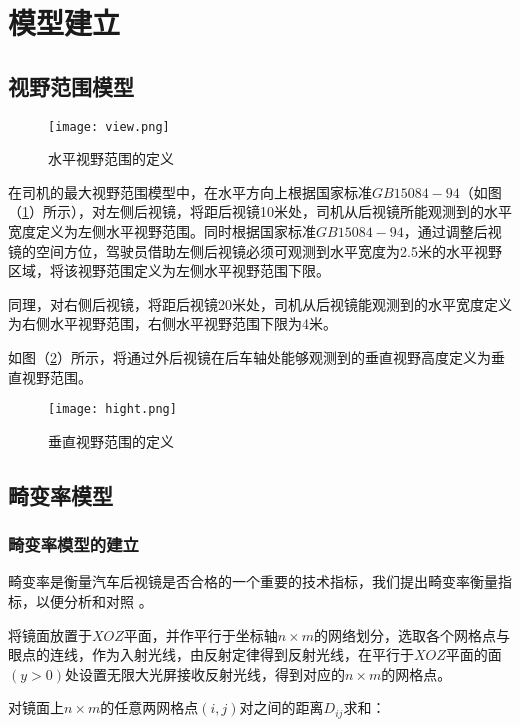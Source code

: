 \documentclass[withoutpreface,bwprint]{cumcmthesis} %
\begin{document}
\section{模型建立}
\subsection{视野范围模型}

\begin{figure}[!htb]
\centering
\texttt{[image: view.png]}
\caption{水平视野范围的定义}
\label{view}
\end{figure}

\par 在司机的最大视野范围模型中，在水平方向上根据国家标准$GB 15084-94$（如图（\ref{view}）所示），对左侧后视镜，将距后视镜10米处，司机从后视镜所能观测到的水平宽度定义为左侧水平视野范围。同时根据国家标准$GB 15084-94$，通过调整后视镜的空间方位，驾驶员借助左侧后视镜必须可观测到水平宽度为2.5米的水平视野区域，将该视野范围定义为左侧水平视野范围下限。

\par 同理，对右侧后视镜，将距后视镜20米处，司机从后视镜能观测到的水平宽度定义为右侧水平视野范围，右侧水平视野范围下限为4米。
\par 如图（\ref{hight}）所示，将通过外后视镜在后车轴处能够观测到的垂直视野高度定义为垂直视野范围。

\begin{figure}[!htb]
\centering
\texttt{[image: hight.png]}
\caption{垂直视野范围的定义}
\label{hight}
\end{figure}

\subsection{畸变率模型}
\subsubsection{畸变率模型的建立}

\par 畸变率是衡量汽车后视镜是否合格的一个重要的技术指标，我们提出畸变率衡量指标，以便分析和对照 。

\par 将镜面放置于$XOZ$平面，并作平行于坐标轴$n \times m$的网络划分，选取各个网格点与眼点的连线，作为入射光线，由反射定律得到反射光线，在平行于$XOZ$平面的面$(y>0)$处设置无限大光屏接收反射光线，得到对应的$n \times m$的网格点。
\par 对镜面上$n \times m$的任意两网格点$(i,j)$对之间的距离$D_{ij}$求和：
\end{document}
